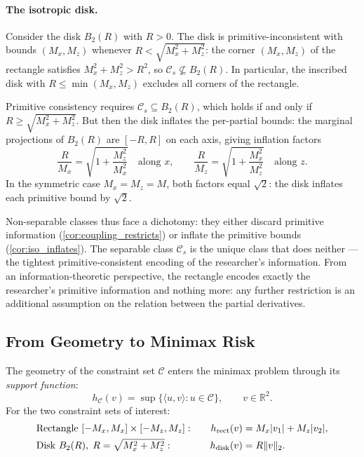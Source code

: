 \paragraph{The isotropic disk.}
Consider the disk $B_2(R)$ with $R > 0$.
The disk is primitive-inconsistent with bounds $(M_x, M_z)$ whenever $R < \sqrt{M_x^2 + M_z^2}$: the corner $(M_x, M_z)$ of the rectangle satisfies $M_x^2 + M_z^2 > R^2$, so $\mathcal{C}_s \not\subseteq B_2(R)$.
In particular, the inscribed disk with $R \leq \min(M_x, M_z)$ excludes all corners of the rectangle.

Primitive consistency requires $\mathcal{C}_s \subseteq B_2(R)$, which holds if and only if $R \geq \sqrt{M_x^2 + M_z^2}$.
But then the disk inflates the per-partial bounds: the marginal projections of $B_2(R)$ are $[-R, R]$ on each axis, giving inflation factors
\begin{equation*}
	\frac{R}{M_x} = \sqrt{1 + \frac{M_z^2}{M_x^2}} \quad \text{along } x, \qquad \frac{R}{M_z} = \sqrt{1 + \frac{M_x^2}{M_z^2}} \quad \text{along } z.
\end{equation*}
In the symmetric case $M_x = M_z = M$, both factors equal $\sqrt{2}$: the disk inflates each primitive bound by $\sqrt{2}$.

Non-separable classes thus face a dichotomy: they either discard primitive information (\cref{cor:coupling_restricts}) or inflate the primitive bounds (\cref{cor:iso_inflates}).
The separable class $\mathcal{C}_s$ is the unique class that does neither --- the tightest primitive-consistent encoding of the researcher's information.
From an information-theoretic perspective, the rectangle encodes exactly the researcher's primitive information and nothing more: any further restriction is an additional assumption on the relation between the partial derivatives.


\subsection{From Geometry to Minimax Risk}\label{sec:argument:risk}

The geometry of the constraint set $\mathcal{C}$ enters the minimax problem through its \emph{support function}:
\begin{equation*}
	h_{\mathcal{C}}(v) = \sup\bigl\{ \langle u, v \rangle : u \in \mathcal{C} \bigr\}, \qquad v \in \mathbb{R}^2.
\end{equation*}
For the two constraint sets of interest:
\begin{alignat*}{2}
	&\text{Rectangle } [-M_x, M_x] \times [-M_z, M_z]: &\quad h_{\mathrm{rect}}(v) &= M_x \lvert v_1\rvert + M_z \lvert v_2\rvert, \\
	&\text{Disk } B_2(R),\; R = \sqrt{M_x^2 + M_z^2}: &\quad h_{\mathrm{disk}}(v) &= R \lVert v\rVert_2.
\end{alignat*}

